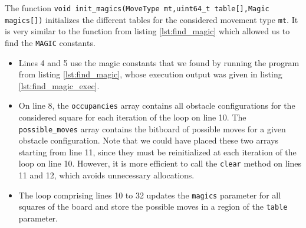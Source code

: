 \documentclass[12pt,a4paper,twoside,openright]{book}
\begin{document}
The function \texttt{void init_magics(MoveType mt,uint64_t table[],Magic magics[])} initializes the different tables for the considered movement type \texttt{mt}. It is very similar to the function from listing \ref{lst:find_magic} which allowed us to find the \texttt{MAGIC} constants.

\begin{itemize}
\item Lines 4 and 5 use the magic constants that we found by running the program from listing \ref{lst:find_magic}, whose execution output was given in listing \ref{lst:find_magic_exec}.

\item On line 8, the \texttt{occupancies} array contains all obstacle configurations for the considered square for each iteration of the loop on line 10. The \texttt{possible_moves} array contains the bitboard of possible moves for a given obstacle configuration. Note that we could have placed these two arrays starting from line 11, since they must be reinitialized at each iteration of the loop on line 10. However, it is more efficient to call the \texttt{clear} method on lines 11 and 12, which avoids unnecessary allocations.

\item The loop comprising lines 10 to 32 updates the \texttt{magics} parameter for all squares of the board and store the possible moves in a region of the \texttt{table} parameter.


\end{itemize}
\end{document}
